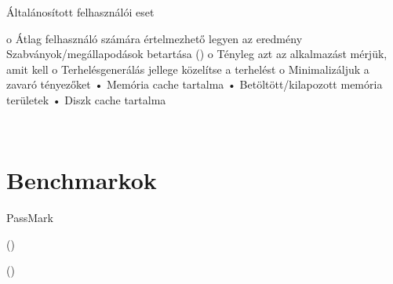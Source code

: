 Általánosított felhasználói eset

o Átlag felhasználó számára értelmezhető legyen az
eredmény
Szabványok/megállapodások betartása
 ()
o Tényleg azt az alkalmazást mérjük, amit kell
o Terhelésgenerálás jellege közelítse a  terhelést
o Minimalizáljuk a zavaró tényezőket
• Memória cache tartalma
• Betöltött/kilapozott memória területek
• Diszk cache tartalma

~\cite{DBLP:books/mk/Gray93}


\section{Benchmarkok\kieg}

PassMark

 ()

 ()

